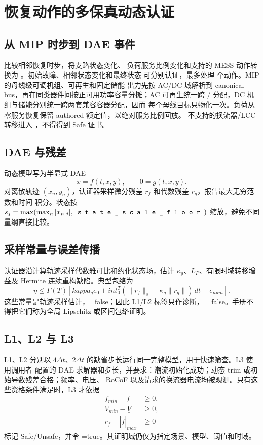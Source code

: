\section{恢复动作的多保真动态认证}\label{sec:res-dynamic}

\subsection{从 MIP 时步到 DAE 事件}
 比较相邻恢复时步，将支路状态变化、
负荷服务比例变化和支持的 MESS 动作转换为 。初始故障、相邻状态变化和最终状态
可分别认证，最多处理  个动作。MIP 的母线级可调机组、可再生和固定储能
出力先按 AC/DC 域解析到 canonical bus，再在同类器件间按正可用功率容量分摊；AC 可再生统一跨
/ 分配，DC 机组与储能分别统一跨两套兼容容器分配，因而
每个母线目标只物化一次。负荷从零服务恢复保留 authored 额定值，以绝对服务比例回放。
不支持的换流器/LCC 转移进入 ，不得得到 Safe 证书。

\subsection{DAE 与残差}
动态模型写为半显式 DAE
\begin{equation}
 \dot x=f(t,x,y),\qquad 0=g(t,x,y).
\end{equation}
对离散轨迹 $(x_n,y_n)$，认证器采样微分残差 $r_f$ 和代数残差 $r_g$，报告最大无穷范数和时间
积分。状态按
$s_j=\max(\max_n|x_{n,j}|,\fld{state\_scale\_floor})$ 缩放，避免不同量纲直接比较。

\subsection{采样常量与误差传播}
认证器沿计算轨迹采样代数雅可比和约化状态场，估计 $\kappa_g$、$L_F$、有限时域转移增益及
Hermite 连续重构缺陷。典型包络为
\begin{equation}
 \eta\le \Gamma(T)\left[kappa_g e_0+int_0^T
   (\|r_f\|_s+\kappa_g\|r_g\|)\,dt+e_{num}\right].
\end{equation}
这些常量是轨迹采样估计，=false；因此 L1/L2 标签只作诊断，
=false。手册不得把它们称为全局 Lipschitz 或区间包络证明。

\subsection{L1、L2 与 L3}
L1、L2 分别以 $4\Delta t$、$2\Delta t$ 的缺省步长运行同一完整模型，用于快速筛查。L3 使用调用者
配置的 DAE 求解器和步长，并要求：潮流初始化成功；动态 trim 或初始导数残差合格；频率、电压、
RoCoF 以及请求的换流器电流均被观测。只有这些资格条件满足时，L3 才依据
\begin{align}
 f_{min}-\underline f&\ge0,\\
 V_{min}-\underline V&\ge0,\\
 \overline r_f-|\dot f|_{max}&\ge0
\end{align}
标记 Safe/Unsafe，并令 =true。其证明域仍仅为指定场景、模型、阈值和时域。

